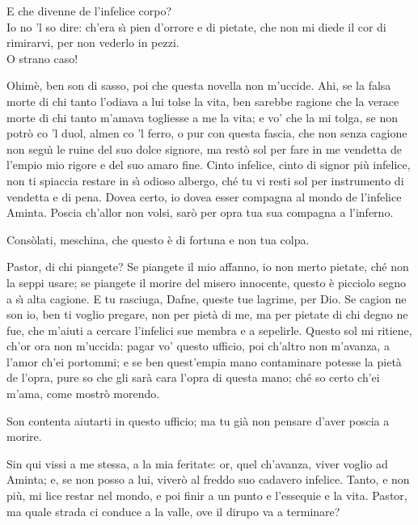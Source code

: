 \documentclass{book}
\begin{document}
   \9 E che divenne
	de l'infelice corpo? \\

    Io no 'l so dire:
	ch'era s\`{\i} pien d'orrore e di pietate,
	che non mi diede il cor di rimirarvi,
	per non vederlo in pezzi. \\

   \9 O strano caso!

	\3 Ohim\`e, ben son di sasso,
	poi che questa novella non m'uccide.
	Ahi, se la falsa morte
	di chi tanto l'odiava
	a lui tolse la vita,
	ben sarebbe ragione
	che la verace morte
	di chi tanto m'amava
	togliesse a me la vita;
	e vo' che la mi tolga,
	se non potr\`o co 'l duol, almen co 'l ferro,
	o pur con questa fascia,
	che non senza cagione
	non segu\`{\i} le ruine
	del suo dolce signore,
	ma rest\`o sol per fare in me vendetta
	de l'empio mio rigore
	e del suo amaro fine.
	Cinto infelice, cinto
	di signor pi\`u infelice,
	non ti spiaccia restare
	in s\`{\i} odioso albergo,
	ch\'e tu vi resti sol per instrumento
	di vendetta e di pena.
	Dovea certo, io dovea
	esser compagna al mondo
	de l'infelice Aminta.
	Poscia ch'allor non volsi,
	sar\`o per opra tua
	sua compagna a l'inferno.

	\9 Cons\`olati, meschina,
	che questo \`e di fortuna e non tua colpa.

	\3 Pastor, di chi piangete?
	Se piangete il mio affanno,
	io non merto pietate,
	ch\'e non la seppi usare;
	se piangete il morire
	del misero innocente,
	questo \`e picciolo segno
	a s\`{\i} alta cagione. E tu rasciuga,
	Dafne, queste tue lagrime, per Dio.
	Se cagion ne son io,
	ben ti voglio pregare,
	non per piet\`a di me, ma per pietate
	di chi degno ne fue,
	che m'aiuti a cercare
	l'infelici sue membra e a sepelirle.
	Questo sol mi ritiene,
	ch'or ora non m'uccida:
	pagar vo' questo ufficio,
	poi ch'altro non m'avanza,
	a l'amor ch'ei portommi;
	e se ben quest'empia
	mano contaminare
	potesse la piet\`a de l'opra, pure
	so che gli sar\`a cara
	l'opra di questa mano;
	ch\'e so certo ch'ei m'ama,
	come mostr\`o morendo.

	\2 Son contenta aiutarti in questo ufficio;
	ma tu gi\`a non pensare
	d'aver poscia a morire.

	\3 Sin qui vissi a me stessa,
	a la mia feritate: or, quel ch'avanza,
	viver voglio ad Aminta;
	e, se non posso a lui,
	viver\`o al freddo suo
	cadavero infelice.
	Tanto, e non pi\`u, mi lice
	restar nel mondo, e poi finir a un punto
	e l'essequie e la vita.
	Pastor, ma quale strada
	ci conduce a la valle, ove il dirupo
	va a terminare? \\
\end{document}
